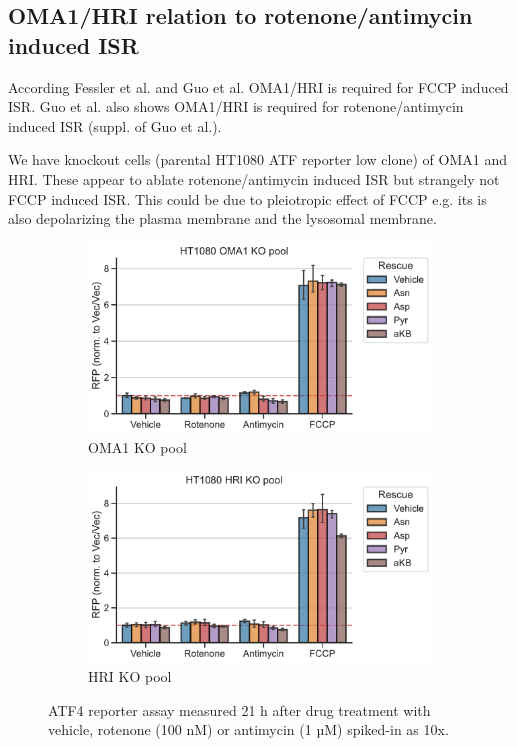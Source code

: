 \FloatBarrier
\subsection{OMA1/HRI relation to rotenone/antimycin induced ISR}
According Fessler et al. and Guo et al. \cite{Fessler2020-zk, Guo2020-ia} OMA1/HRI is required for FCCP induced ISR.
Guo et al. also shows OMA1/HRI is required for rotenone/antimycin induced ISR (suppl. of Guo et al.).

We have knockout cells (parental HT1080 ATF reporter low clone) of OMA1 and HRI.
These appear to ablate rotenone/antimycin induced ISR but strangely not FCCP induced ISR.
This could be due to pleiotropic effect of FCCP e.g. its is also depolarizing the plasma membrane and the lysosomal membrane.

\begin{figure}[!ht]
     \centering
     \begin{subfigure}[b]{0.49\textwidth}
         \includegraphics[width=\textwidth]{figures/sapp/ISR/ATF4rep_OMA1pool.pdf}
         \caption{OMA1 KO pool}
         \label{fig:sapp:ISR:ATF4rep_OMA1pool}
     \end{subfigure}
     \hfill
     \begin{subfigure}[b]{0.49\textwidth}
         \includegraphics[width=\textwidth]{figures/sapp/ISR/ATF4rep_HRIpool.pdf}
         \caption{HRI KO pool}
         \label{fig:sapp:ISR:ATF4rep_HRIpool}
     \end{subfigure}
     \hfill
        \caption[ATF4 post mito inhib. OMA1/HRI KO, reporter]{
        ATF4 reporter assay measured 21 h after drug treatment with vehicle, rotenone (100 nM) or antimycin (1 µM) spiked-in as 10x.
        }
        \label{fig:sapp:ISR:ATF4rep_OMA1_HRIpool}
\end{figure}

